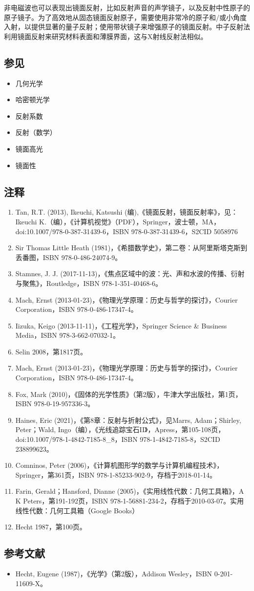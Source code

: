 非电磁波也可以表现出镜面反射，比如反射声音的声学镜子，以及反射中性原子的原子镜子。为了高效地从固态镜面反射原子，需要使用非常冷的原子和/或小角度入射，以提供显著的量子反射；使用带状镜子来增强原子的镜面反射。中子反射法利用镜面反射来研究材料表面和薄膜界面，这与X射线反射法相似。
\subsection{参见}  
\begin{itemize}
\item 几何光学  
\item 哈密顿光学  
\item 反射系数  
\item 反射（数学）  
\item 镜面高光  
\item 镜面性 
\end{itemize} 
\subsection{注释}  
\begin{enumerate}
\item Tan, R.T. (2013), Ikeuchi, Katsushi (编),《镜面反射，镜面反射率》，见：Ikeuchi K.（编），《计算机视觉》（PDF），Springer，波士顿，MA，doi:10.1007/978-0-387-31439-6，ISBN 978-0-387-31439-6，S2CID 5058976  
\item Sir Thomas Little Heath (1981)，《希腊数学史》，第二卷：从阿里斯塔克斯到丢番图，ISBN 978-0-486-24074-9。  
\item Stamnes, J. J. (2017-11-13)，《焦点区域中的波：光、声和水波的传播、衍射与聚焦》，Routledge，ISBN 978-1-351-40468-6。  
\item Mach, Ernst (2013-01-23)，《物理光学原理：历史与哲学的探讨》，Courier Corporation，ISBN 978-0-486-17347-4。  
\item Iizuka, Keigo (2013-11-11)，《工程光学》，Springer Science & Business Media，ISBN 978-3-662-07032-1。  
\item Selin 2008，第1817页。  
\item Mach, Ernst (2013-01-23)，《物理光学原理：历史与哲学的探讨》，Courier Corporation，ISBN 978-0-486-17347-4。  
\item Fox, Mark (2010)，《固体的光学性质》（第2版），牛津大学出版社，第1页，ISBN 978-0-19-957336-3。  
\item Haines, Eric (2021)，《第8章：反射与折射公式》，见Marrs, Adam；Shirley, Peter；Wald, Ingo（编），《光线追踪宝石II》，Apress，第105-108页，doi:10.1007/978-1-4842-7185-8_8，ISBN 978-1-4842-7185-8，S2CID 238899623。  
\item Comninos, Peter (2006)，《计算机图形学的数学与计算机编程技术》，Springer，第361页，ISBN 978-1-85233-902-9，存档于2018-01-14。  
\item Farin, Gerald；Hansford, Dianne (2005)，《实用线性代数：几何工具箱》，A K Peters，第191-192页，ISBN 978-1-56881-234-2，存档于2010-03-07。实用线性代数：几何工具箱（Google Books）  
\item Hecht 1987，第100页。
\end{enumerate}
\subsection{参考文献}  
\begin{itemize}
\item Hecht, Eugene (1987)，《光学》（第2版），Addison Wesley，ISBN 0-201-11609-X。
\end{itemize}